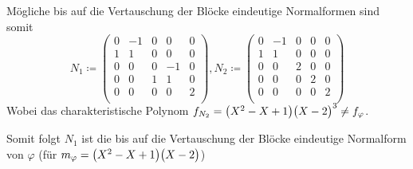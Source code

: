 \documentclass{scrreprt}
\begin{document}
\begin{itemize}
  Mögliche bis auf die Vertauschung der Blöcke eindeutige Normalformen sind somit
  \[
    N_1 \coloneqq \begin{pmatrix}
      0 & -1 &  0 &  0 & 0 \\
      1 & 1  &  0 &  0 & 0 \\
      0 & 0  &  0 & -1 & 0 \\
      0 & 0  &  1 &  1 & 0 \\
      0 & 0  &  0 &  0 & 2 \\
    \end{pmatrix}, N_2 \coloneqq \begin{pmatrix}
      0 & -1 & 0 & 0 & 0 \\
      1 &  1 & 0 & 0 & 0 \\
      0 &  0 & 2 & 0 & 0 \\
      0 &  0 & 0 & 2 & 0 \\
      0 &  0 & 0 & 0 & 2 \\
    \end{pmatrix}
  \]
  Wobei das charakteristische Polynom
  $f_{N_2} = \qty\big(X^2 - X + 1)\qty\big(X - 2)^3 \ne f_{\varphi}$.

  Somit folgt $N_1$ ist die bis auf die Vertauschung der Blöcke eindeutige
  Normalform von $\varphi$
  (für $m_{\varphi} = \qty\big(X^2 - X + 1)\qty\big(X - 2)$)
\end{itemize}
\end{document}
